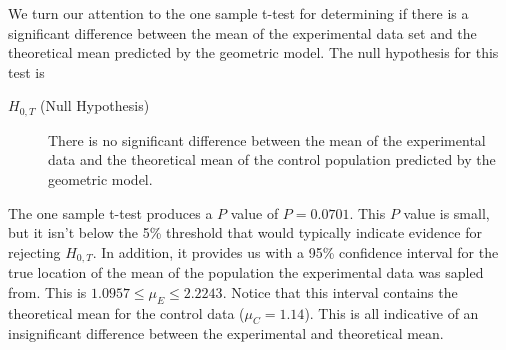 \documentclass{amsart}
\begin{document}
We turn our attention to the one sample t-test for determining if there is a significant difference between the mean of the experimental data set and the theoretical mean predicted by the geometric model. The null hypothesis for this test is
\begin{description}
\item[$H_{0,T}$ (Null Hypothesis)] There is no significant difference between the mean of the experimental data and the theoretical mean of the control population predicted by the geometric model.
\end{description}
The one sample t-test produces a $P$ value of $P=0.0701$. This $P$ value is small, but it isn't below the 5\% threshold that would typically indicate evidence for rejecting $H_{0,T}$. In addition, it provides us with a 95\% confidence interval for the true location of the mean of the population the experimental data was sapled from. This is $1.0957 \le \mu_E \le 2.2243$. Notice that this interval contains the theoretical mean for the control data ($\mu_C=1.14$). This is all indicative of an insignificant difference between the experimental and theoretical mean.
\end{document}

